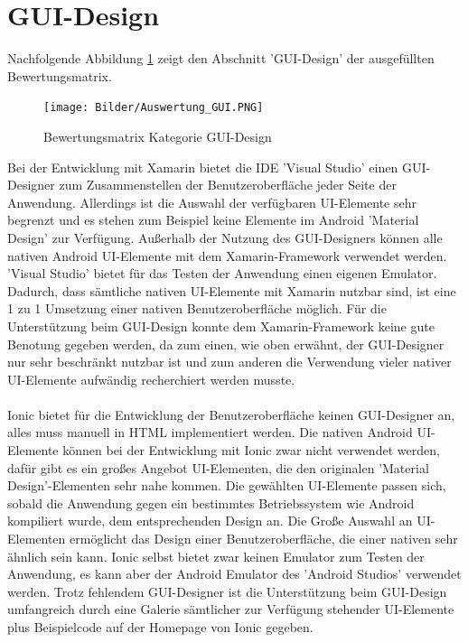 \section{GUI-Design} \label{AuswGUI}

Nachfolgende Abbildung \ref{fig:AuswGUI} zeigt den Abschnitt 'GUI-Design' der ausgefüllten Bewertungsmatrix.

\begin{figure}[h]
	\centering
	\texttt{[image: Bilder/Auswertung\_GUI.PNG]}
	\caption{Bewertungsmatrix Kategorie GUI-Design}
	\label{fig:AuswGUI}
\end{figure}

Bei der Entwicklung mit Xamarin bietet die IDE 'Visual Studio' einen GUI-Designer zum Zusammenstellen der Benutzeroberfläche jeder Seite der Anwendung. Allerdings ist die Auswahl der verfügbaren UI-Elemente sehr begrenzt und es stehen zum Beispiel keine Elemente im Android 'Material Design' zur Verfügung. Außerhalb der Nutzung des GUI-Designers können alle nativen Android UI-Elemente mit dem Xamarin-Framework verwendet werden. 'Visual Studio' bietet für das Testen der Anwendung einen eigenen Emulator. Dadurch, dass sämtliche nativen UI-Elemente mit Xamarin nutzbar sind, ist eine 1 zu 1 Umsetzung einer nativen Benutzeroberfläche möglich. Für die Unterstützung beim GUI-Design konnte dem Xamarin-Framework keine gute Benotung gegeben werden, da zum einen, wie oben erwähnt, der GUI-Designer nur sehr beschränkt nutzbar ist und zum anderen die Verwendung vieler nativer UI-Elemente aufwändig recherchiert werden musste. 
\\
\\
Ionic bietet für die Entwicklung der Benutzeroberfläche keinen GUI-Designer an, alles muss manuell in HTML implementiert werden. Die nativen Android UI-Elemente können bei der Entwicklung mit Ionic zwar nicht verwendet werden, dafür gibt es ein großes Angebot UI-Elementen, die den originalen 'Material Design'-Elementen sehr nahe kommen. Die gewählten UI-Elemente passen sich, sobald die Anwendung gegen ein bestimmtes Betriebssystem wie Android kompiliert wurde, dem entsprechenden Design an. Die Große Auswahl an UI-Elementen ermöglicht das Design einer Benutzeroberfläche, die einer nativen sehr ähnlich sein kann. Ionic selbst bietet zwar keinen Emulator zum Testen der Anwendung, es kann aber der Android Emulator des 'Android Studios' verwendet werden. Trotz fehlendem GUI-Designer ist die Unterstützung beim GUI-Design umfangreich durch eine Galerie sämtlicher zur Verfügung stehender UI-Elemente plus Beispielcode auf der Homepage von Ionic gegeben. 
